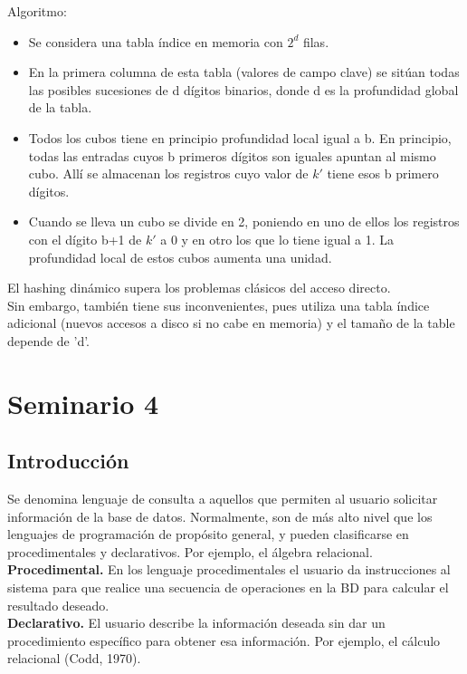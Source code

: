 \documentclass[a4paper,11pt]{article}
\begin{document}
Algoritmo:

\begin{itemize}
\item Se considera una tabla índice en memoria con $2^d$ filas.
\item En la primera columna de esta tabla (valores de campo clave) se sitúan todas las posibles sucesiones de d dígitos binarios, donde d es la profundidad global de la tabla.
\item Todos los cubos tiene en principio profundidad local igual a b. En principio, todas las entradas cuyos b primeros dígitos son iguales apuntan al mismo cubo. Allí se almacenan los registros cuyo valor de $k'$ tiene esos b primero dígitos. 
\item Cuando se lleva un cubo se divide en 2, poniendo en uno de ellos los registros con el dígito b+1 de $k'$ a 0 y en otro los que lo tiene igual a 1. La profundidad local de estos cubos aumenta una unidad.
\end{itemize}


El hashing dinámico supera los problemas clásicos del acceso directo. \\

Sin embargo, también tiene sus inconvenientes, pues utiliza una tabla índice adicional (nuevos accesos a disco si no cabe en memoria) y el tamaño de la table depende de 'd'.

\section{Seminario 4}
\subsection{Introducción}
Se denomina lenguaje de consulta a aquellos que permiten al usuario solicitar información de la base de datos. Normalmente, son de más alto nivel que los lenguajes de programación de propósito general, y pueden clasificarse en procedimentales y declarativos. Por ejemplo, el álgebra relacional.\\

\textbf{Procedimental.} En los lenguaje procedimentales el usuario da instrucciones al sistema para que realice una secuencia de operaciones en la BD para calcular el resultado deseado. \\

\textbf{Declarativo.} El usuario describe la información deseada sin dar un procedimiento específico para obtener esa información. Por ejemplo, el cálculo relacional (Codd, 1970). \\
\end{document}
